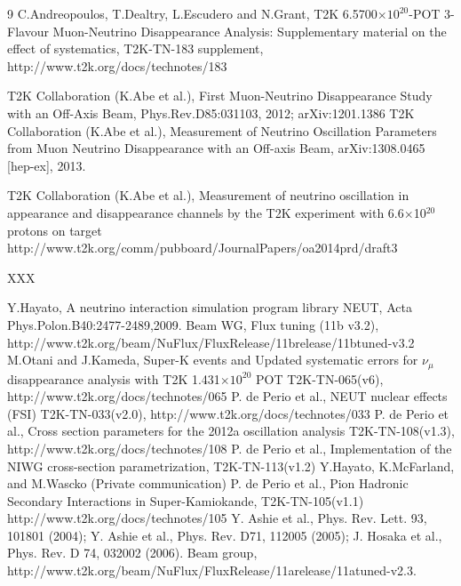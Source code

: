 \begin{thebibliography}{9}
%
%
  C.Andreopoulos, T.Dealtry, L.Escudero and N.Grant,
  T2K 6.5700$\times10^{20}$-POT 3-Flavour Muon-Neutrino Disappearance Analysis:
  Supplementary material on the effect of systematics,
  T2K-TN-183 supplement,\\
  http://www.t2k.org/docs/technotes/183

%
%
   T2K Collaboration (K.Abe et al.), 
   First Muon-Neutrino Disappearance Study with an Off-Axis Beam,
   Phys.Rev.D85:031103, 2012; arXiv:1201.1386
  T2K Collaboration (K.Abe et al.),
  Measurement of Neutrino Oscillation Parameters from Muon Neutrino Disappearance with an Off-axis Beam,
  arXiv:1308.0465 [hep-ex], 2013.
  
%
%
   T2K Collaboration (K.Abe et al.),
   Measurement of neutrino oscillation in appearance and disappearance channels by the T2K experiment with 
   6.6$\times$10$^{20}$ protons on target 
   http://www.t2k.org/comm/pubboard/JournalPapers/oa2014prd/draft3

%
%
XXX

%
%
  Y.Hayato, A neutrino interaction simulation program library NEUT,
  Acta Phys.Polon.B40:2477-2489,2009.
   Beam WG, Flux tuning (11b v3.2), http://www.t2k.org/beam/NuFlux/FluxRelease/11brelease/11btuned-v3.2
   M.Otani and J.Kameda,
   Super-K events and Updated systematic errors for $\nu_\mu$ disappearance analysis with T2K 1.431$\times10^{20}$ POT
   T2K-TN-065(v6),
   http://www.t2k.org/docs/technotes/065
  P. de Perio et al.,
  NEUT nuclear effects (FSI)
  T2K-TN-033(v2.0),
  http://www.t2k.org/docs/technotes/033
  P. de Perio et al.,
  Cross section parameters for the 2012a oscillation analysis
  T2K-TN-108(v1.3),
  http://www.t2k.org/docs/technotes/108
  P. de Perio et al.,
  Implementation of the NIWG cross-section parametrization,
  T2K-TN-113(v1.2) 
  Y.Hayato, K.McFarland, and M.Wascko (Private communication) 
  P. de Perio et al.,
  Pion Hadronic Secondary Interactions in Super-Kamiokande,
  T2K-TN-105(v1.1)
  http://www.t2k.org/docs/technotes/105
  Y. Ashie et al., Phys. Rev. Lett. 93, 101801 (2004);
  Y. Ashie et al., Phys. Rev. D71, 112005 (2005); 
  J. Hosaka et al., Phys. Rev. D 74, 032002 (2006).
  Beam group,
  http://www.t2k.org/beam/NuFlux/FluxRelease/11arelease/11atuned-v2.3.


\end{thebibliography}
